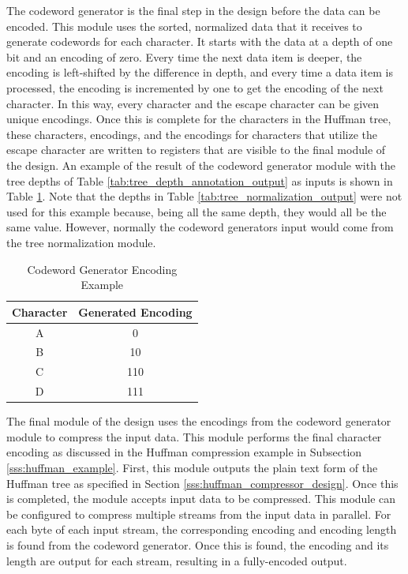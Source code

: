 \documentclass[doublespace,nopageskip]{VTthesis}
\begin{document}
The codeword generator is the final step in the design before the data can be encoded. This module uses the sorted, normalized data that it receives to generate codewords for each character. It starts with the data at a depth of one bit and an encoding of zero. Every time the next data item is deeper, the encoding is left-shifted by the difference in depth, and every time a data item is processed, the encoding is incremented by one to get the encoding of the next character. In this way, every character and the escape character can be given unique encodings. Once this is complete for the characters in the Huffman tree, these characters, encodings, and the encodings for characters that utilize the escape character are written to registers that are visible to the final module of the design. An example of the result of the codeword generator module with the tree depths of Table \ref{tab:tree_depth_annotation_output} as inputs is shown in Table \ref{tab:codeword_generator_encodings}. Note that the depths in Table \ref{tab:tree_normalization_output} were not used for this example because, being all the same depth, they would all be the same value. However, normally the codeword generators input would come from the tree normalization module.

\begin{table}[htb]
	\centering
	\caption{Codeword Generator Encoding Example}
	\begin{tabular}{cc}
	    \toprule
	    Character & Generated Encoding\\
	    \midrule
	    A & 0 \\
	    \midrule
	    B & 10 \\
	    \midrule
	    C & 110 \\
	    \midrule
	    D & 111 \\
	    \bottomrule
	\end{tabular}
	\label{tab:codeword_generator_encodings}
\end{table}

The final module of the design uses the encodings from the codeword generator module to compress the input data. This module performs the final character encoding as discussed in the Huffman compression example in Subsection \ref{sss:huffman_example}. First, this module outputs the plain text form of the Huffman tree as specified in Section \ref{sss:huffman_compressor_design}. Once this is completed, the module accepts input data to be compressed. This module can be configured to compress multiple streams from the input data in parallel. For each byte of each input stream, the corresponding encoding and encoding length is found from the codeword generator. Once this is found, the encoding and its length are output for each stream, resulting in a fully-encoded output.
\end{document}
